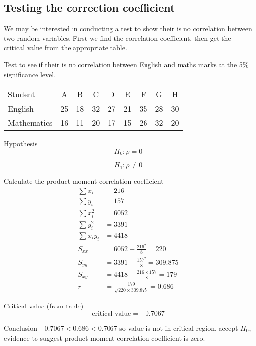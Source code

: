     \newpage
    \subsection{Testing the correction coefficient}
        We may be interested in conducting a test to show their is no correlation between two random variables. First we find the correlation coefficient, then get the critical value from the appropriate table.

        \begin{example}
        {
            Test to see if their is no correlation between English and maths marks at the 5\% significance level.

            \begin{center}
            \begin{tabular}{l|c|c|c|c|c|c|c|c}
            Student        & A  & B  & C  & D  & E  & F  & G  & H  \\
            English        & 25 & 18 & 32 & 27 & 21 & 35 & 28 & 30 \\
            Mathematics    & 16 & 11 & 20 & 17 & 15 & 26 & 32 & 20 \\
            \end{tabular}
            \end{center}
        }

        \begin{step}{Hypothesis} 
        $$H_0: \rho = 0$$

        $$H_1: \rho \ne 0$$
        \end{step}

        \begin{step}{Calculate the product moment correlation coefficient}
        \begin{align*}
        \sum{x_i} &= 216\\
        \sum{y_i} &= 157\\
        \sum{x_i^2} &= 6052\\
        \sum{y_i^2} &= 3391\\
        \sum{x_i y_i} &= 4418\\
        S_{xx} &= 6052 - \frac{216^2}{8} = 220\\
        S_{yy} &= 3391 - \frac{157^2}{8} = 309.875\\
        S_{xy} &= 4418 - \frac{216 \times 157}{8} = 179\\
        r &= \frac{179}{\sqrt{220 \times 309.875}} = 0.686
        \end{align*}
        \end{step}

        \begin{step}{Critical value (from table)}
        $$
        \text{critical value} = \pm 0.7067
        $$
        \end{step}

        \begin{step}{Conclusion}
        $-0.7067 < 0.686 < 0.7067$ so value is not in critical region, accept $H_0$, evidence to suggest product moment correlation coefficient is zero.
        \end{step}

        \end{example}